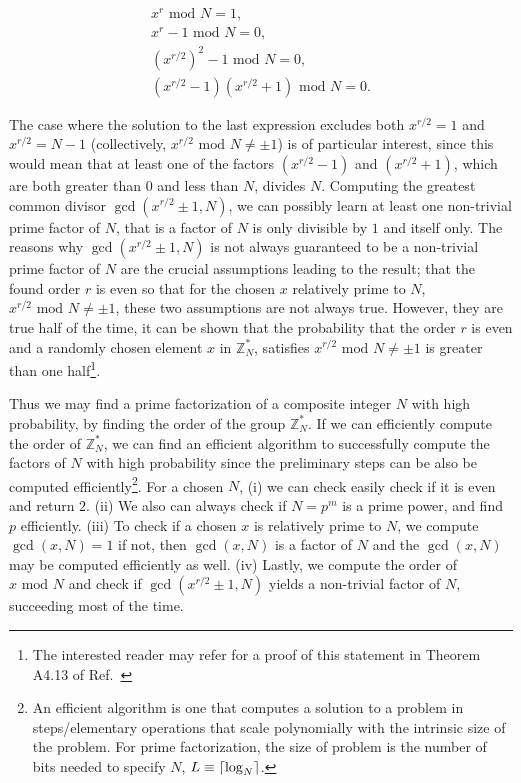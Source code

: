 \begin{align}
	x^{r} \text{ mod } N = 1, \nonumber \\
	x^{r} - 1 \text{ mod } N = 0, \nonumber \\
	(x^{r/2})^2 - 1 \text{ mod } N = 0, \nonumber \\
	(x^{r/2} - 1)(x^{r/2} + 1) \text{ mod } N  = 0.
\end{align}

\noindent
The case where the solution to the last expression excludes both $x^{r/2} = 1$ and $x^{r/2} = N - 1$ (collectively, $x^{r/2} \text{ mod } N \neq \pm 1$) is of particular interest, since this would mean that at least one of the factors $(x^{r/2} - 1)$ and $(x^{r/2} + 1)$, which are both greater than $0$ and less than $N$, divides $N$. Computing the greatest common divisor $\gcd(x^{r/2} \pm 1, N)$, we can possibly learn at least one non-trivial prime factor of $N$, that is a factor of $N$ is only divisible by $1$ and itself only. The reasons why $\gcd(x^{r/2} \pm 1, N)$ is not always guaranteed to be a non-trivial prime factor of $N$ are the crucial assumptions leading to the result; that the found order $r$ is even so that for the chosen $x$ relatively prime to $N$, $x^{r/2} \text{ mod } N \neq \pm 1$, these two assumptions are not always true. However, they are true half of the time, it can be shown that the probability that the order $r$ is even and a randomly chosen element $x$ in $\mathbb{Z}_N^{*}$, satisfies $x^{r/2} \text{ mod } N \neq \pm  1$ is greater than one half\footnote{The interested reader may refer for a proof of this statement in Theorem A4.13 of Ref.~\cite{Mike&Ike}}. 


\clearpage
\noindent
Thus we may find a prime factorization of a composite integer $N$ with high probability, by finding the order of the group $\mathbb{Z}_{N}^{*}$. If we can efficiently compute the order of $\mathbb{Z}_{N}^{*}$, we can find an efficient algorithm to successfully compute the factors of $N$ with high probability since the preliminary steps can be also be computed efficiently\footnote{An efficient algorithm is one that computes a solution to a problem in steps/elementary operations that scale polynomially with the intrinsic size of the problem. For prime factorization, the size of problem is the  number of bits needed to specify $N$, $L \equiv \lceil\log_{N}\rceil$.}. For a chosen $N$, (i) we can check easily check if it is even and return $2$. (ii) We also can always check if $N=p^{m}$ is a prime power, and find $p$ efficiently. (iii) To check if a chosen $x$ is relatively prime to $N$, we compute $\gcd{(x, N)} = 1$ if not, then $\gcd{(x, N)}$ is a factor of $N$ and the $\gcd(x, N)$ may be computed efficiently as well. (iv) Lastly, we compute the order of $x\text{ mod }N$ and check if $\gcd{(x^{r/2}\pm 1, N)}$ yields a non-trivial factor of $N$, succeeding most of the time.

